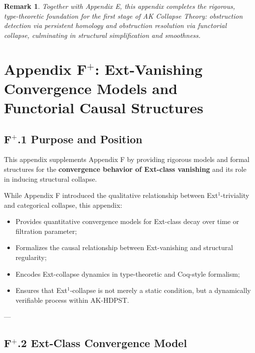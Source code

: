 \documentclass[11pt]{article}
\newtheorem{remark}[theorem]{Remark}
\begin{document}
\begin{remark}
Together with Appendix E, this appendix completes the rigorous, type-theoretic foundation for the first stage of AK Collapse Theory: obstruction detection via persistent homology and obstruction resolution via functorial collapse, culminating in structural simplification and smoothness.
\end{remark}




\section*{Appendix F$^{+}$: Ext-Vanishing Convergence Models and Functorial Causal Structures}

\subsection*{F$^{+}$.1 Purpose and Position}

This appendix supplements Appendix F by providing rigorous models and formal structures for the \textbf{convergence behavior of Ext-class vanishing} and its role in inducing structural collapse.

While Appendix F introduced the qualitative relationship between Ext$^1$-triviality and categorical collapse, this appendix:

\begin{itemize}
    \item Provides quantitative convergence models for Ext-class decay over time or filtration parameter;
    \item Formalizes the causal relationship between Ext-vanishing and structural regularity;
    \item Encodes Ext-collapse dynamics in type-theoretic and Coq-style formalism;
    \item Ensures that Ext$^1$-collapse is not merely a static condition, but a dynamically verifiable process within AK-HDPST.
\end{itemize}

---

\subsection*{F$^{+}$.2 Ext-Class Convergence Model}
\end{document}

